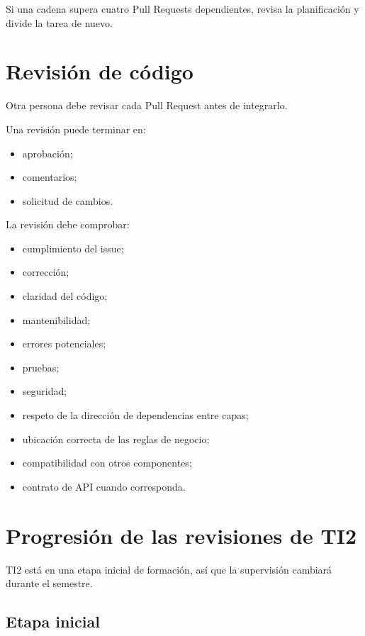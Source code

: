 \documentclass[11pt,a4paper]{article}
\begin{document}
Si una cadena supera cuatro Pull Requests dependientes, revisa la planificación
y divide la tarea de nuevo.


\section{Revisión de código}

Otra persona debe revisar cada Pull Request antes de integrarlo.

Una revisión puede terminar en:

\begin{itemize}
  \item aprobación;
  \item comentarios;
  \item solicitud de cambios.
\end{itemize}

La revisión debe comprobar:

\begin{itemize}
  \item cumplimiento del issue;
  \item corrección;
  \item claridad del código;
  \item mantenibilidad;
  \item errores potenciales;
  \item pruebas;
  \item seguridad;
  \item respeto de la dirección de dependencias entre capas;
  \item ubicación correcta de las reglas de negocio;
  \item compatibilidad con otros componentes;
  \item contrato de API cuando corresponda.
\end{itemize}


\section{Progresión de las revisiones de TI2}

TI2 está en una etapa inicial de formación, así que la supervisión cambiará
durante el semestre.

\subsection*{Etapa inicial}
\end{document}
